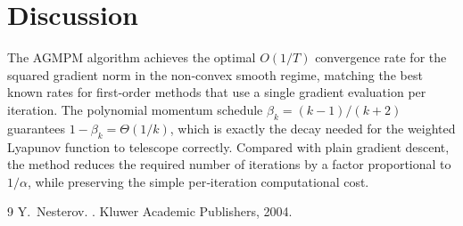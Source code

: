 \documentclass{article}
\begin{document}
\section*{Discussion}
The AGMPM algorithm achieves the optimal $O(1/T)$ convergence rate
for the squared gradient norm in the non‑convex smooth regime, matching
the best known rates for first‑order methods that use a single gradient
evaluation per iteration.  The polynomial momentum schedule
$\beta_k=(k-1)/(k+2)$ guarantees $1-\beta_k=\Theta(1/k)$, which is exactly the
decay needed for the weighted Lyapunov function to telescope correctly.
Compared with plain gradient descent, the method reduces the required number
of iterations by a factor proportional to $1/\alpha$, while preserving the
simple per‑iteration computational cost.


\begin{thebibliography}{9}
Y.~Nesterov.
.
\newblock Kluwer Academic Publishers, 2004.
\end{thebibliography}
\end{document}
